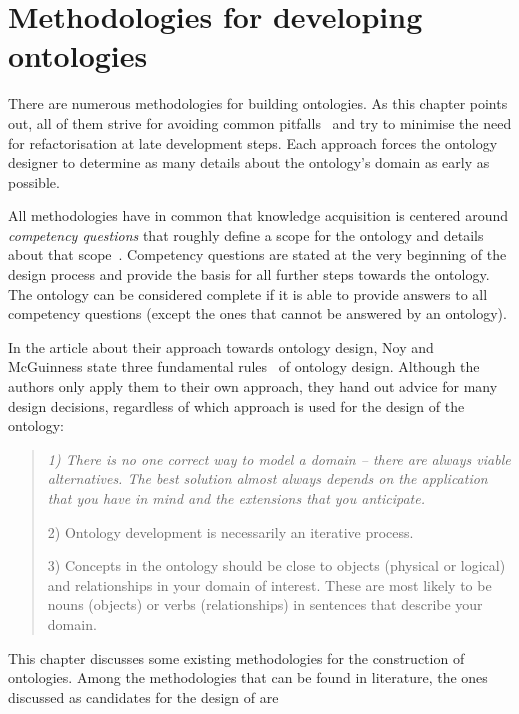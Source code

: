 \chapter{Methodologies for developing ontologies}
\label{ch:development_approaches}

There are numerous methodologies for building ontologies. As this chapter points out, all of them strive for avoiding common pitfalls~\cite{ontology_pitfalls} and try to minimise the need for refactorisation at late development steps. Each approach forces the ontology designer to determine as many details about the ontology's domain as early as possible.

All methodologies have in common that knowledge acquisition is centered around \emph{competency questions} that roughly define a scope for the ontology and details about that scope~\cite{competency_questions}. Competency questions are stated at the very beginning of the design process and provide the basis for all further steps towards the ontology. The ontology can be considered complete if it is able to provide answers to all competency questions (except the ones that cannot be answered by an ontology).

In the article about their approach towards ontology design, Noy and McGuinness state three fundamental rules~\cite{Ontology101} of ontology design. Although the authors only apply them to their own approach, they hand out advice for many design decisions, regardless of which approach is used for the design of the ontology:

\begin{quote}
\itshape
1) There is no one correct way to model a domain -- there are always viable alternatives. The best solution almost always depends on the application that you have in mind and the extensions that you anticipate.

2) Ontology development is necessarily an iterative process.

3) Concepts in the ontology should be close to objects (physical or logical) and relationships in your domain of interest. These are most likely to be nouns (objects) or verbs (relationships) in sentences that describe your domain.\normalfont\cite{Ontology101}
\end{quote}

This chapter discusses some existing methodologies for the construction of ontologies. Among the methodologies that can be found in literature, the ones discussed as candidates for the design of \smarthomeweather are

